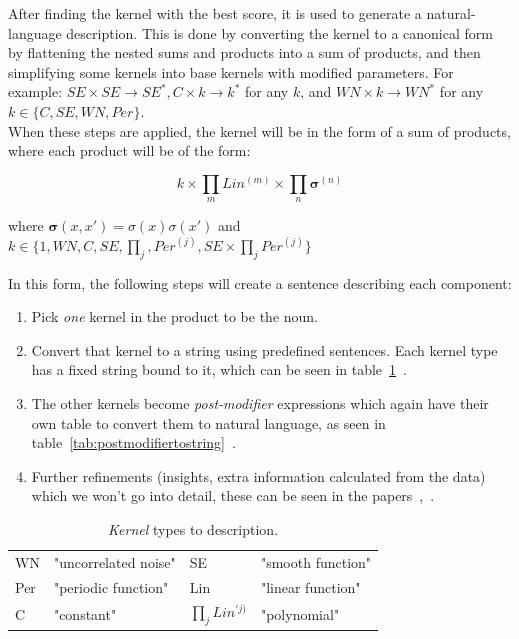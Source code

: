 \documentclass[a4paper, 10pt, conference]{ieeeconf}
\begin{document}
After finding the kernel with the best score, it is used to generate a natural-language description. This is done by converting the kernel to a canonical form by flattening the nested sums and products into a sum of products, and then simplifying some kernels into base kernels with modified parameters. For example: $SE \times SE \rightarrow SE^{*}, C \times k \rightarrow k^*$ for any $k$, and $WN \times k \rightarrow WN^*$ for any $k \in \{C, SE, WN, Per\}$.\\
When these steps are applied, the kernel will be in the form of a sum of products, where each product will be of the form:

\begin{equation}
    k \times \prod_m Lin^{(m)} \times \prod_n \boldsymbol{\sigma} ^{(n)}
\end{equation}

where $\boldsymbol{\sigma}(x,x') = \sigma(x) \sigma(x')$ and $k \in \{ 1, WN, C, SE, \prod_j, Per^{(j)}, SE \times \prod_j Per^{(j)}\}$

In this form, the following steps will create a sentence describing each component:
\begin{enumerate}
    \item Pick \textit{one} kernel in the product to be the noun.
    \item Convert that kernel to a string using predefined sentences. Each kernel type has a fixed string bound to it, which can be seen in table~\ref{tab:kerneltostring}~\cite{lloyd2014automatic}.
    \item The other kernels become \textit{post-modifier} expressions which again have their own table to convert them to natural language, as seen in table~\ref{tab:postmodifiertostring}~\cite{lloyd2014automatic}.
    \item Further refinements (insights, extra information calculated from the data) which we won't go into detail, these can be seen in the papers~\cite{lloyd2014automatic},~\cite{lloyd2015representation}.
\end{enumerate}

\begin{table}[!ht]
    \centering
    \begin{tabular}{ll|ll}
        WN  & "uncorrelated noise" & SE                  & "smooth function" \\
        Per & "periodic function"  & Lin                 & "linear function" \\
        C   & "constant"           & $\prod_j Lin^{'j)}$ & "polynomial"     
    \end{tabular}
    \caption{\textit{Kernel} types to description.}
    \label{tab:kerneltostring}
\end{table}
\end{document}

